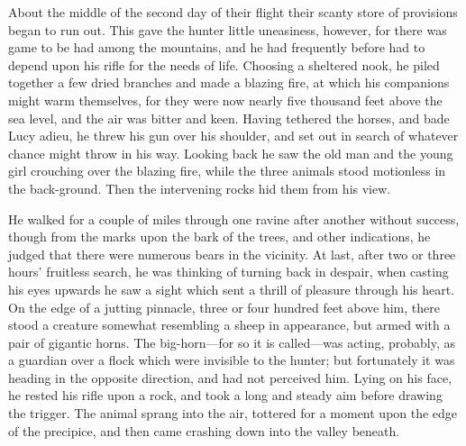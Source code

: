 About the middle of the second day of their flight their scanty store of provisions began to run out. This gave the hunter little uneasiness, however, for there was game to be had among the mountains, and he had frequently before had to depend upon his rifle for the needs of life. Choosing a sheltered nook, he piled together a few dried branches and made a blazing fire, at which his companions might warm themselves, for they were now nearly five thousand feet above the sea level, and the air was bitter and keen. Having tethered the horses, and bade Lucy adieu, he threw his gun over his shoulder, and set out in search of whatever chance might throw in his way. Looking back he saw the old man and the young girl crouching over the blazing fire, while the three animals stood motionless in the back-ground. Then the intervening rocks hid them from his view.

He walked for a couple of miles through one ravine after another without success, though from the marks upon the bark of the trees, and other indications, he judged that there were numerous bears in the vicinity. At last, after two or three hours' fruitless search, he was thinking of turning back in despair, when casting his eyes upwards he saw a sight which sent a thrill of pleasure through his heart. On the edge of a jutting pinnacle, three or four hundred feet above him, there stood a creature somewhat resembling a sheep in appearance, but armed with a pair of gigantic horns. The big-horn—for so it is called—was acting, probably, as a guardian over a flock which were invisible to the hunter; but fortunately it was heading in the opposite direction, and had not perceived him. Lying on his face, he rested his rifle upon a rock, and took a long and steady aim before drawing the trigger. The animal sprang into the air, tottered for a moment upon the edge of the precipice, and then came crashing down into the valley beneath.

